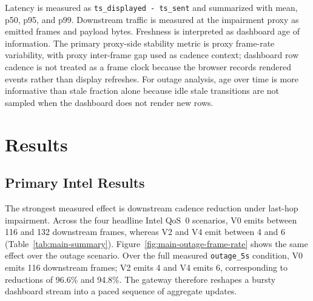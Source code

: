 \documentclass[sigconf,authorversion,nonacm]{acmart}
\begin{document}
Latency is measured as \texttt{ts\_displayed - ts\_sent} and summarized with mean, p50, p95, and p99. Downstream traffic is measured at the impairment proxy as emitted frames and payload bytes. Freshness is interpreted as dashboard age of information. The primary proxy-side stability metric is proxy frame-rate variability, with proxy inter-frame gap used as cadence context; dashboard row cadence is not treated as a frame clock because the browser records rendered events rather than display refreshes. For outage analysis, age over time is more informative than stale fraction alone because idle stale transitions are not sampled when the dashboard does not render new rows.

\FloatBarrier
\section{Results}

\subsection{Primary Intel Results}

The strongest measured effect is downstream cadence reduction under last-hop impairment. Across the four headline Intel QoS~0 scenarios, V0 emits between 116 and 132 downstream frames, whereas V2 and V4 emit between 4 and 6 (Table~\ref{tab:main-summary}). Figure~\ref{fig:main-outage-frame-rate} shows the same effect over the outage scenario. Over the full measured \texttt{outage\_5s} condition, V0 emits 116 downstream frames; V2 emits 4 and V4 emits 6, corresponding to reductions of 96.6\% and 94.8\%. The gateway therefore reshapes a bursty dashboard stream into a paced sequence of aggregate updates.
\end{document}
